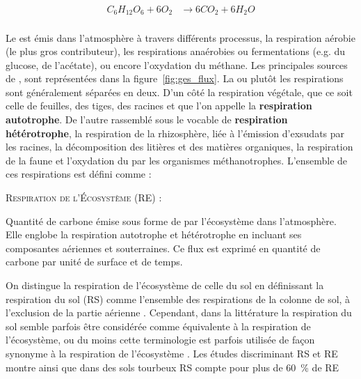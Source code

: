 $$\begin{aligned}\label{eq:respi}
C_{6}H_{12}O_{6} + 6O_{2} &\rightarrow 6CO_{2} + 6H_{2}O \\
\end{aligned} $$


Le \coo est émis dans l'atmosphère à travers différents processus, la respiration aérobie (le plus gros contributeur), les respirations anaérobies ou fermentations (e.g. du glucose, de l'acétate), ou encore l'oxydation du méthane.
Les principales sources de \coo, sont représentées dans la figure~\ref{fig:ges_flux}.
La ou plutôt les respirations sont généralement séparées en deux.
D'un côté la respiration végétale, que ce soit celle de feuilles, des tiges, des racines et que l'on appelle la \textbf{respiration autotrophe}.
De l'autre rassemblé sous le vocable de \textbf{respiration hétérotrophe}, la respiration de la rhizosphère, liée à l'émission d'exsudats par les racines, la décomposition des litières et des matières organiques, la respiration de la faune et l'oxydation du \chh par les organismes méthanotrophes.
L'ensemble de ces respirations est défini comme : 
\begin{pdef}
\textsc{Respiration de l'Écosystème (RE)} :

Quantité de carbone émise sous forme de \coo par l'écosystème dans l'atmosphère. 
Elle englobe la respiration autotrophe et hétérotrophe en incluant ses composantes aériennes et souterraines.
Ce flux est exprimé en quantité de carbone par unité de surface et de temps.
\end{pdef}
On distingue la respiration de l'écosystème de celle du sol en définissant la respiration du sol (RS) comme l'ensemble des respirations de la colonne de sol, à l'exclusion de la partie aérienne \citep{luo20063}.
Cependant, dans la littérature la respiration du sol semble parfois être considérée comme équivalente à la respiration de l'écosystème, ou du moins cette terminologie est parfois utilisée de façon synonyme à la respiration de l'écosystème \citep{raich1992}.
Les études discriminant RS et RE montre ainsi que dans des sols tourbeux RS compte pour plus de \SI{60}{\percent} de RE \cite{lohila2003}
%

